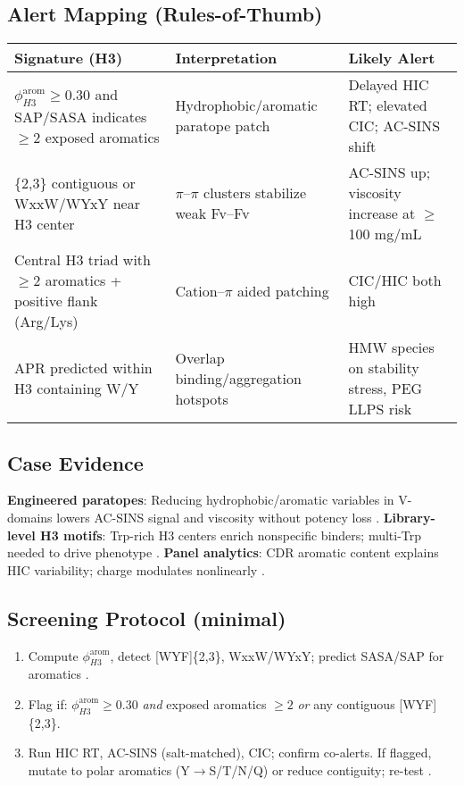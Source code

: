 \subsection*{Alert Mapping (Rules-of-Thumb)}
\begin{center}
\begin{tabular}{p{3.6cm} p{6.8cm} p{4.2cm}}
\textbf{Signature (H3)} & \textbf{Interpretation} & \textbf{Likely Alert}\\ \hline
$\phi_{H3}^{\text{arom}}\ge 0.30$ and SAP/SASA indicates $\ge 2$ exposed aromatics & Hydrophobic/aromatic paratope patch & Delayed HIC RT; elevated CIC; AC-SINS shift \cite{Hebditch2019,Jain2017}\\
[WYF]\{2,3\} contiguous or WxxW/WYxY near H3 center & $\pi$–$\pi$ clusters stabilize weak Fv–Fv & AC-SINS up; viscosity increase at $\ge$100 mg/mL \cite{Kelly2017,Phan2022,Park2024}\\
Central H3 triad with $\ge$2 aromatics + positive flank (Arg/Lys) & Cation–$\pi$ aided patching & CIC/HIC both high \cite{Kohli2015,Jain2017}\\
APR predicted within H3 containing W/Y & Overlap binding/aggregation hotspots & HMW species on stability stress, PEG LLPS risk \cite{Wang2010,Hebditch2019}\\
\end{tabular}
\end{center}

\subsection*{Case Evidence}
\textbf{Engineered paratopes}: Reducing hydrophobic/aromatic variables in V-domains lowers AC-SINS signal and viscosity without potency loss \cite{Geoghegan2016,Dai2024}. \textbf{Library-level H3 motifs}: Trp-rich H3 centers enrich nonspecific binders; multi-Trp needed to drive phenotype \cite{Kelly2017}. \textbf{Panel analytics}: CDR aromatic content explains HIC variability; charge modulates nonlinearly \cite{Hebditch2019,Jain2017}.

\subsection*{Screening Protocol (minimal)}
\begin{enumerate}
  \item Compute $\phi_{H3}^{\text{arom}}$, detect [WYF]\{2,3\}, WxxW/WYxY; predict SASA/SAP for aromatics \cite{Jain2017,Park2024}.
  \item Flag if: $\phi_{H3}^{\text{arom}}\ge 0.30$ \emph{and} exposed aromatics $\ge 2$ \emph{or} any contiguous [WYF]\{2,3\}. 
  \item Run HIC RT, AC-SINS (salt-matched), CIC; confirm co-alerts. If flagged, mutate to polar aromatics (Y$\rightarrow$S/T/N/Q) or reduce contiguity; re-test \cite{Geoghegan2016,Dai2024}.
\end{enumerate}

